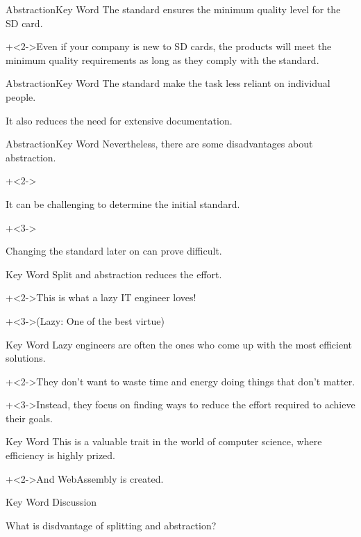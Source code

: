 \begin{frame}{Abstraction}{Key Word}
    The standard ensures the minimum quality level for the SD card.
    \vspace{4ex}

    \onslide+<2->{Even if your company is new to SD cards, the products will meet the minimum quality requirements as long as they comply with the standard.}
\end{frame}


\begin{frame}{Abstraction}{Key Word}
    The standard make the task less reliant on individual people.
    \vspce{4ex}

    It also reduces the need for extensive documentation.
\end{frame}


\begin{frame}{Abstraction}{Key Word}
    Nevertheless, there are some disadvantages about abstraction.
    \vspace{4ex}

    \begin{itemize}
        \onslide+<2->{\item It can be challenging to determine the initial standard.}
        \onslide+<3->{\item Changing the standard later on can prove difficult.}
    \end{itemize}
\end{frame}


\begin{frame}{Key Word}
    Split and abstraction reduces the effort.
    \vspace{4ex}

    \onslide+<2->{This is what a lazy IT engineer loves!}
    \vspace{2ex}

    \onslide+<3->{{\Large (Lazy: One of the best virtue)}}
\end{frame}


\begin{frame}{Key Word}{}
    Lazy engineers are often the ones who come up with the most efficient solutions.
    \vspace{4ex}

    \onslide+<2->{They don't want to waste time and energy doing things that don't matter.}
    \vspace{4ex}

    \onslide+<3->{Instead, they focus on finding ways to reduce the effort required to achieve their goals.}
\end{frame}


\begin{frame}{Key Word}{}
    This is a valuable trait in the world of computer science, where efficiency is highly prized.
    \vspace{4ex}

    \onslide+<2->{And WebAssembly is created.}
\end{frame}


\begin{frame}{Key Word}{}
    Discussion
    \vspace{4ex}

    What is disdvantage of splitting and abstraction?
\end{frame}
